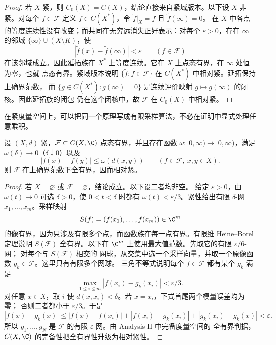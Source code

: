 \begin{proof}
若 $X$ 紧，则 $C_0(X)=C(X)$，结论直接来自紧域版本。以下设 $X$ 非紧。对每个 $f\in\mathcal F$
定义 $\widetilde f\in C(X^*)$，令 $\widetilde f|_X=f$ 且 $\widetilde f(\infty)=0$。
在 $X$ 中各点的等度连续性没有改变；而共同在无穷远消失正好表示：对每个 $\varepsilon>0$，存在
$\infty$ 的邻域 $\{\infty\}\cup(X\setminus K)$，使
\[
 |\widetilde f(x)-\widetilde f(\infty)|<\varepsilon
 \qquad(f\in\mathcal F)
\]
在该邻域成立。因此延拓族在 $X^*$ 上等度连续。它在 $X$ 上点态有界，在 $\infty$ 处恒为零，也就
点态有界。紧域版本说明 $\{\widetilde f:f\in\mathcal F\}$ 在 $C(X^*)$ 中相对紧。延拓保持上确界范数，
而 $\{g\in C(X^*):g(\infty)=0\}$ 是连续评价映射 $g\mapsto g(\infty)$ 的闭核。因此延拓族的闭包
仍在这个闭核中，故 $\mathcal F$ 在 $C_0(X)$ 中相对紧。
\end{proof}

在紧度量空间上，可以把同一个原理写成有限采样算法，不必在证明中显式处理任意乘积。

\begin{proposition}[紧度量空间的有限采样判据]\label{proposition:1-3-2-4}
设 $(X,d)$ 紧，$\mathcal F\subset C(X,\C)$ 点态有界，并且存在函数
$\omega:[0,\infty)\to[0,\infty)$，满足 $\omega(\delta)\to0$（$\delta\downarrow0$）以及
\[
  |f(x)-f(y)|\le\omega(d(x,y))
  \qquad(f\in\mathcal F,\ x,y\in X).
\]
则 $\mathcal F$ 在上确界范数下全有界，因而相对紧。
\end{proposition}

\begin{proof}
若 $X=\varnothing$ 或 $\mathcal F=\varnothing$，结论成立。以下设二者均非空。
给定 $\varepsilon>0$，由 $\omega(t)\to0$ 可选 $\delta>0$，使 $0<t<\delta$ 时都有
$\omega(t)<\varepsilon/3$。紧性给出有限
$\delta$-网 $x_1,\ldots,x_m$。采样映射
\[
  S(f)=(f(x_1),\ldots,f(x_m))\in\C^m
\]
的像有界，因为只涉及有限多个点，而函数族在每一点有界。有限维 Heine--Borel 定理说明
$S(\mathcal F)$ 全有界。以下在 $\C^m$ 上使用最大值范数。先取它的有限 $\varepsilon/6$-网；
对每个与 $S(\mathcal F)$ 相交的
网球，从交集中选一个采样向量，并取一个原像函数 $g_k\in\mathcal F$。这里只有有限多个网球。
三角不等式说明每个 $f\in\mathcal F$ 都有某个 $g_k$ 满足
\[
  \max_{1\le i\le m}|f(x_i)-g_k(x_i)|<\varepsilon/3.
\]
对任意 $x\in X$，取 $i$ 使 $d(x,x_i)<\delta$。若 $x=x_i$，下式首尾两个模量误差均为零；
否则二者都小于 $\varepsilon/3$。于是
\[
 |f(x)-g_k(x)|
 \le |f(x)-f(x_i)|+|f(x_i)-g_k(x_i)|+|g_k(x_i)-g_k(x)|
 <\varepsilon.
\]
所以 $g_1,\ldots,g_N$ 是 $\mathcal F$ 的有限 $\varepsilon$-网。由 Analysis II 中完备度量空间的
全有界判据，$C(X,\C)$ 的完备性把全有界性升级为相对紧性。
\end{proof}

